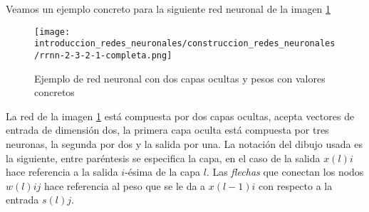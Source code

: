 Veamos un ejemplo concreto para la siguiente red neuronal de la imagen \ref{img:construccion_rrnn:rrnn-2-3-2-1}
\begin{figure}[h!]
    \texttt{[image: introduccion\_redes\_neuronales/construccion\_redes\_neuronales/rrnn-2-3-2-1-completa.png]}
    \caption{Ejemplo de red neuronal con dos capas ocultas y pesos con valores concretos}
    \label{img:construccion_rrnn:rrnn-2-3-2-1}
\end{figure} 

La red de la imagen \ref{img:construccion_rrnn:rrnn-2-3-2-1} está 
compuesta por dos capas ocultas, acepta vectores de entrada de dimensión dos, 
la primera capa oculta está compuesta por tres neuronas, 
la segunda por dos y la salida por una. 
La notación del dibujo usada es la siguiente, entre paréntesis se 
especifica la capa, en el caso de la salida $x(l)i$ hace referencia a la salida $i$-ésima de la capa $l$. Las \textit{flechas} que conectan los nodos $w(l)ij$ hace referencia al peso que se le da a $x(l-1)i$ con respecto a la entrada $s(l)j$.

